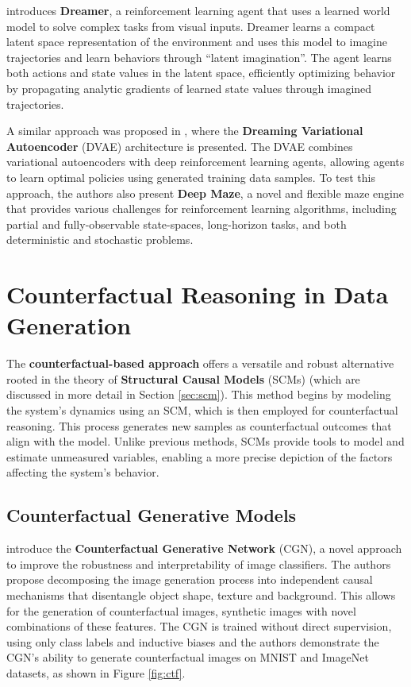 \cite{hafner2020} 
introduces \textbf{Dreamer}, a reinforcement learning
agent that uses a learned world model to solve complex
tasks from visual inputs. Dreamer learns a compact
latent space representation of the environment and
uses this model to imagine trajectories and learn
behaviors through ``latent imagination''.
The agent learns both actions and state values in the
latent space, efficiently optimizing behavior
by propagating analytic gradients of learned
state values through imagined trajectories.

A similar approach was proposed in \cite{andersen2018},
where the \textbf{Dreaming Variational Autoencoder} (DVAE)
architecture is presented.
The DVAE combines variational autoencoders
with deep reinforcement learning agents,
allowing agents to learn optimal policies using
generated training data samples. To test this approach,
the authors also present \textbf{Deep Maze}, a novel and flexible
maze engine that provides various challenges
for reinforcement learning algorithms,
including partial and fully-observable state-spaces,
long-horizon tasks, and both deterministic and
stochastic problems.

\section{Counterfactual Reasoning in Data Generation}

The \textbf{counterfactual-based approach} offers a
versatile and robust alternative rooted in
the theory of \textbf{Structural Causal Models} (SCMs) 
(which are discussed in more detail in Section
\ref{sec:scm}).
This method begins by modeling the system's
dynamics using an SCM, which is then employed
for counterfactual reasoning. This process generates
new samples as counterfactual outcomes that align with
the model. Unlike previous methods, SCMs provide
tools to model and estimate unmeasured variables,
enabling a more precise depiction of the factors
affecting the system's behavior.

\subsection{Counterfactual Generative Models}

\cite{sauer2021} introduce the
\textbf{Counterfactual Generative Network} (CGN),
a novel approach to improve the robustness and
interpretability of image classifiers.
The authors propose decomposing the image
generation process into independent causal
mechanisms that disentangle object shape, texture
and background. This allows for the generation of
counterfactual images, synthetic images with novel
combinations of these features.
The CGN is trained without direct supervision,
using only class labels and inductive biases and
the authors demonstrate the CGN's ability to
generate counterfactual images
on MNIST and ImageNet datasets, as shown
in Figure \ref{fig:ctf}.

